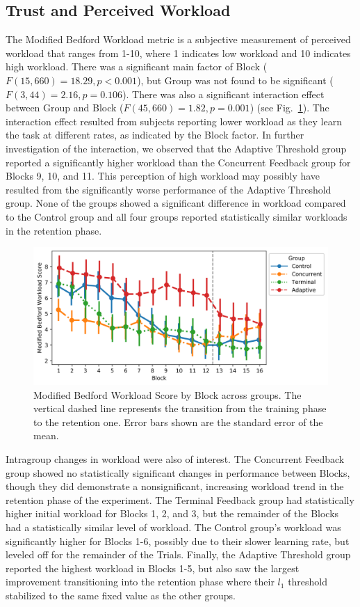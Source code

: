 \subsection{Trust and Perceived Workload}
The Modified Bedford Workload metric is a subjective measurement of perceived workload that ranges from 1-10, where 1 indicates low workload and 10 indicates high workload.
There was a significant main factor of Block ($F(15, 660) = 18.29, p < 0.001$), but Group was not found to be significant ($F(3, 44) = 2.16, p = 0.106$).
There was also a significant interaction effect between Group and Block ($F(45, 660)= 1.82, p = 0.001$) (see Fig.~\ref{figure:label5}).
The interaction effect resulted from subjects reporting lower workload as they learn the task at different rates, as indicated by the Block factor.
In further investigation of the interaction, we observed that the Adaptive Threshold group reported a significantly higher workload than the Concurrent Feedback group for Blocks 9, 10, and 11.
This perception of high workload may possibly have resulted from the significantly worse performance of the Adaptive Threshold group.
None of the groups showed a significant difference in workload compared to the Control group and all four groups reported statistically similar workloads in the retention phase.

\begin{figure}[hbt!]
\centering
\includegraphics[height=.4\textwidth]{figures/ModifiedBedfordWorkloadScore}
\caption{\label{figure:label5} Modified Bedford Workload Score by Block across groups.
The vertical dashed line represents the transition from the training phase to the retention one.
Error bars shown are the standard error of the mean.}
\end{figure}

Intragroup changes in workload were also of interest.
The Concurrent Feedback group showed no statistically significant changes in performance between Blocks, though they did demonstrate a nonsignificant, increasing workload trend in the retention phase of the experiment.
The Terminal Feedback group had statistically higher initial workload for Blocks 1, 2, and 3, but the remainder of the Blocks had a statistically similar level of workload.
The Control group's workload was significantly higher for Blocks 1-6, possibly due to their slower learning rate, but leveled off for the remainder of the Trials.
Finally, the Adaptive Threshold group reported the highest workload in Blocks 1-5, but also saw the largest improvement transitioning into the retention phase where their $l_1$ threshold stabilized to the same fixed value as the other groups.

